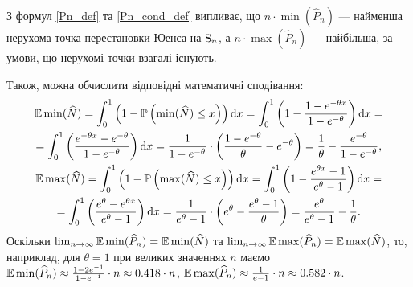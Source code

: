 З формул \eqref{Pn_def} та \eqref{Pn_cond_def} випливає, що
$n \cdot \min(\widehat{P}_n)$ --- найменша нерухома точка
перестановки Юенса на $\mathrm{S}_{n}$, а $n \cdot \max (\widehat{P}_n)$ --- найбільша,
за умови, що нерухомі точки взагалі існують.

Також, можна обчислити відповідні математичні сподівання:
\begin{gather*}
    \mathbb{E}\min(\widehat{N}) = \int_0^1 \left(1 - \mathbb{P}\left(\min(\widehat{N}) \leq x\right)\right) \mathrm{d} x = 
    \int_0^1 \left(1 -  \frac{1-e^{-\theta x}}{1-e^{-\theta}}\right) \mathrm{d} x = \\ =
    \int_0^1 \left(\frac{e^{-\theta x} - e^{-\theta}}{1 - e^{-\theta}}\right) \mathrm{d} x = 
    \frac{1}{1 - e^{-\theta}} \cdot \left(
        \frac{1 - e^{-\theta}}{\theta} - e^{-\theta}
    \right) = 
    \frac{1}{\theta} - \frac{e^{-\theta}}{1 - e^{-\theta}}, \\
    \mathbb{E}\max(\widehat{N}) = \int_0^1 \left(1 - \mathbb{P}\left(\max(\widehat{N}) \leq x\right)\right) \mathrm{d} x = 
    \int_0^1 \left(1 -  \frac{e^{\theta x} - 1}{e^{\theta} - 1}\right) \mathrm{d} x = \\ =
    \int_0^1 \left(\frac{e^{\theta} - e^{\theta x}}{e^{\theta} - 1}\right) \mathrm{d} x = 
    \frac{1}{e^{\theta} - 1} \cdot \left(
        e^{\theta} - \frac{e^{\theta} - 1}{\theta}
    \right) = 
    \frac{e^{\theta}}{e^{\theta} - 1} - \frac{1}{\theta}.
\end{gather*}
Оскільки $\lim_{n\to\infty} \mathbb{E}\min(\widehat{P}_n) = \mathbb{E}\min(\widehat{N})$ та 
$\lim_{n\to\infty} \mathbb{E}\max(\widehat{P}_n) = \mathbb{E}\max(\widehat{N})$, то, наприклад,
для $\theta = 1$ при великих значеннях $n$ маємо 
$\mathbb{E}\min(\widehat{P}_n) \approx \frac{1 - 2e^{-1}}{1 - e^{-1}} \cdot n \approx 0.418 \cdot n$,
$\mathbb{E}\max(\widehat{P}_n) \approx \frac{1}{e - 1} \cdot n \approx 0.582 \cdot n$.

